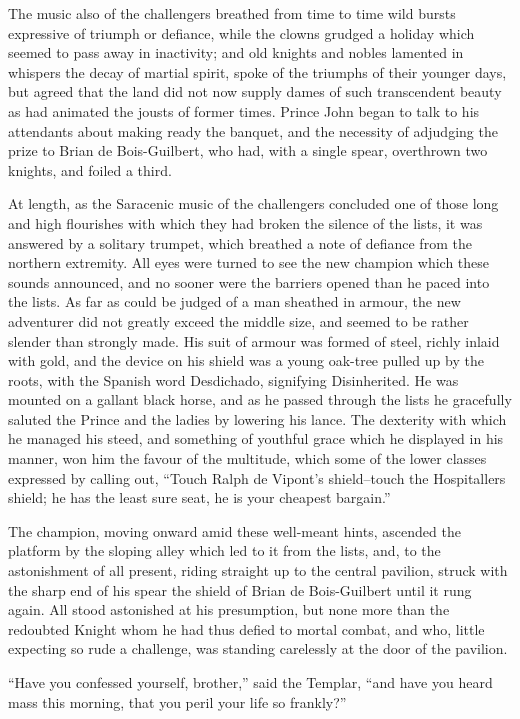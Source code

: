 The music also of the challengers breathed from time to time wild bursts
expressive of triumph or defiance, while the clowns grudged a holiday
which seemed to pass away in inactivity; and old knights and nobles
lamented in whispers the decay of martial spirit, spoke of the triumphs
of their younger days, but agreed that the land did not now supply dames
of such transcendent beauty as had animated the jousts of former times.
Prince John began to talk to his attendants about making ready the
banquet, and the necessity of adjudging the prize to Brian de
Bois-Guilbert, who had, with a single spear, overthrown two knights, and
foiled a third.

At length, as the Saracenic music of the challengers concluded one of
those long and high flourishes with which they had broken the silence of
the lists, it was answered by a solitary trumpet, which breathed a note
of defiance from the northern extremity. All eyes were turned to see the
new champion which these sounds announced, and no sooner were the
barriers opened than he paced into the lists. As far as could be judged
of a man sheathed in armour, the new adventurer did not greatly exceed
the middle size, and seemed to be rather slender than strongly made. His
suit of armour was formed of steel, richly inlaid with gold, and the
device on his shield was a young oak-tree pulled up by the roots, with
the Spanish word Desdichado, signifying Disinherited. He was mounted on
a gallant black horse, and as he passed through the lists he gracefully
saluted the Prince and the ladies by lowering his lance. The dexterity
with which he managed his steed, and something of youthful grace which
he displayed in his manner, won him the favour of the multitude, which
some of the lower classes expressed by calling out, ``Touch Ralph de
Vipont's shield--touch the Hospitallers shield; he has the least sure
seat, he is your cheapest bargain.''

The champion, moving onward amid these well-meant hints, ascended the
platform by the sloping alley which led to it from the lists, and, to
the astonishment of all present, riding straight up to the central
pavilion, struck with the sharp end of his spear the shield of Brian de
Bois-Guilbert until it rung again. All stood astonished at his
presumption, but none more than the redoubted Knight whom he had thus
defied to mortal combat, and who, little expecting so rude a challenge,
was standing carelessly at the door of the pavilion.

``Have you confessed yourself, brother,'' said the Templar, ``and have
you heard mass this morning, that you peril your life so frankly?''


